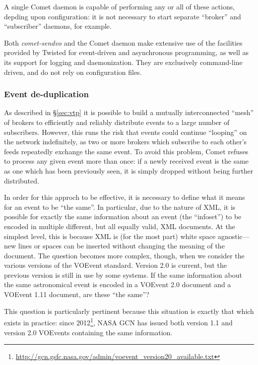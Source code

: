 \documentclass[5p,authoryear]{elsarticle}
\begin{document}
A single Comet daemon is capable of performing any or all of these actions,
depding upon configuration: it is not necessary to start separate ``broker''
and ``subscriber'' daemons, for example.

Both \textit{comet-sendvo} and the Comet daemon make extensive use of the
facilities provided by Twisted for event-driven and asynchronous programming,
as well as its support for logging and daemonization. They are exclusively
command-line driven, and do not rely on configuration files.

\subsubsection{Event de-duplication}
\label{sec:design:dedup}

As described in \S\ref{sec:vtp} it is possible to build a mutually
interconnected ``mesh'' of brokers to efficiently and reliably distribute
events to a large number of subscribers. However, this runs the risk that
events could continue ``looping'' on the network indefinitely, as two or more
brokers which subscribe to each other's feeds repeatedly exchange the same
event. To avoid this problem, Comet refuses to process any given event more
than once: if a newly received event is the same as one which has been
previously seen, it is simply dropped without being further distributed.

In order for this approch to be effective, it is necessary to define what it
means for an event to be ``the same''. In particular, due to the nature of
XML, it is possible for exactly the same information about an event (the
``infoset'') to be encoded in multiple different, but all equally valid, XML
documents. At the simplest level, this is because XML is (for the most part)
white space agnostic---new lines or spaces can be inserted without changing
the meaning of the document. The question becomes more complex, though, when
we consider the various versions of the VOEvent standard. Version 2.0
\citep{Seaman:2011} is current, but the previous version
\citep[1.1;]{Seaman:2006} is still in use by some systems. If the same
information about the same astronomical event is encoded in a VOEvent 2.0
document and a VOEvent 1.11 document, are these ``the same''?

This question is particularly pertinent because this situation is exactly that
which exists in practice: since
2012\footnote{\url{http://gcn.gsfc.nasa.gov/admin/voevent_version20_available.txt}},
NASA GCN has issued both version 1.1 and version 2.0 VOEvents containing the
same information.
\end{document}

